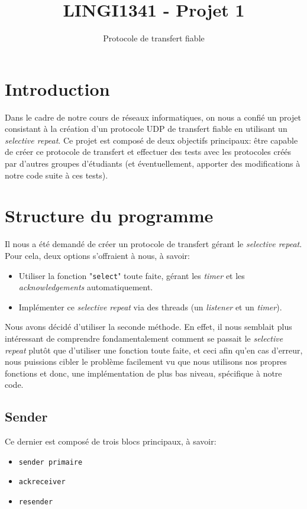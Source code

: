 \documentclass[11pt]{article}
\title{LINGI1341 - Projet 1}
\subtitle{Protocole de transfert fiable}
\begin{document}
\thispagestyle{empty}
\maketitle
\thispagestyle{empty}
\tableofcontents
\setcounter{tocdepth}{3}
\setcounter{page}{1}
\newpage

\section*{Introduction}
Dans le cadre de notre cours de réseaux informatiques, on nous a confié un projet consistant à la création d'un protocole UDP de transfert fiable en utilisant un \textit{selective repeat}. Ce projet est composé de deux objectifs principaux: être capable de créer ce protocole de transfert et effectuer des tests avec les protocoles créés par d'autres groupes d'étudiants (et éventuellement, apporter des modifications à notre code suite à ces tests).

\section{Structure du programme}
Il nous a été demandé de créer un protocole de transfert gérant le \textit{selective repeat}. \\ Pour cela, deux options s'offraient à nous, à savoir:
\begin{itemize}
\item Utiliser la fonction "\texttt{select}" toute faite, gérant les \textit{timer} et les \textit{acknowledgements} automatiquement. 
\item Implémenter ce \textit{selective repeat} via des threads (un \textit{listener} et un \textit{timer}). 
\end{itemize} \smallskip
Nous avons décidé d'utiliser la seconde méthode. En effet, il nous semblait plus intéressant de comprendre fondamentalement comment se passait le \textit{selective repeat} plutôt que d'utiliser une fonction toute faite, et ceci afin qu'en cas d'erreur, nous puissions cibler le problème facilement vu que nous utilisons nos propres fonctions et donc, une implémentation de plus bas niveau, spécifique à notre code. 

\subsection{Sender}
Ce dernier est composé de trois blocs principaux, à savoir: 
\begin{itemize}
\item \texttt{sender primaire}
\item \texttt{ackreceiver}
\item \texttt{resender}
\end{itemize}
\smallskip
\end{document}
